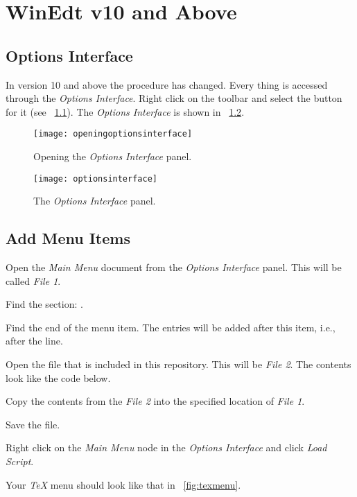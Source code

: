 \chapter{WinEdt v10 and Above}
\section{Options Interface}
In version 10 and above the procedure has changed.  Every thing is accessed through the \textit{Options Interface}.  Right click on the toolbar and select the button for it (see \figurename~\ref{fig:openingoptionsinterface}).  The \textit{Options Interface} is shown in \figurename~\ref{fig:optionsinterface}.
\begin{figure}
	\centering
	\texttt{[image: openingoptionsinterface]}
	\caption{Opening the \textit{Options Interface} panel.}
	\label{fig:openingoptionsinterface}
\end{figure}

\begin{figure}
	\centering
	\texttt{[image: optionsinterface]}
	\caption{The \textit{Options Interface} panel.}
	\label{fig:optionsinterface}
\end{figure}


\section{Add Menu Items}
\label{sec:addmenuitems}
\begin{numberedlist}
	\item Open the \textit{Main Menu} document from the \textit{Options Interface} panel.  This will be called \emph{File 1}.
	\item Find the section: .
	\item Find the end of the  menu item.  The entries will be added after this item, i.e., after the  line.
	\item Open the file  that is included in this repository.  This will be \emph{File 2}.  The contents look like the code below.
	\item Copy the contents from the \emph{File 2} into the specified location of \emph{File 1}.
	\item Save the file.
	\item Right click on the \emph{Main Menu} node in the \emph{Options Interface} and click \emph{Load Script}.
	\item Your \emph{TeX} menu should look like that in \figurename~\ref{fig:texmenu}.
\end{numberedlist}

